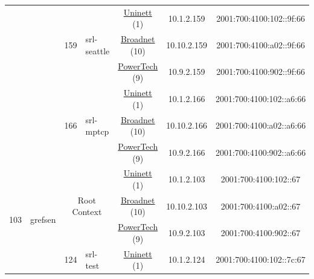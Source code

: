 \begin{small}
\begin{center}
\begin{longtable}{|c|c|c|c|c|c|c|c|}
  &  & \multirow{3}{*}{\tiny{159}} & \multicolumn{1}{|l|}{\multirow{3}{*}{\tiny{srl-seattle}}} & \multicolumn{2}{|c|}{\tiny{\href{https://www.uninett.no}{Uninett} (1)}} & \tiny{10.1.2.159} & \tiny{2001:700:4100:102::9f:66} \\* \cline{5-5}\cline{6-6}\cline{7-7}\cline{8-8}
  &  &  &  & \multicolumn{2}{|c|}{\tiny{\href{https://www.broadnet.no}{Broadnet} (10)}} & \tiny{10.10.2.159} & \tiny{2001:700:4100:a02::9f:66} \\* \cline{5-5}\cline{6-6}\cline{7-7}\cline{8-8}
  &  &  &  & \multicolumn{2}{|c|}{\tiny{\href{http://www.powertech.no}{PowerTech} (9)}} & \tiny{10.9.2.159} & \tiny{2001:700:4100:902::9f:66} \\* \cline{3-3}\cline{4-4}\cline{5-5}\cline{6-6}\cline{7-7}\cline{8-8}
  &  & \multirow{3}{*}{\tiny{166}} & \multicolumn{1}{|l|}{\multirow{3}{*}{\tiny{srl-mptcp}}} & \multicolumn{2}{|c|}{\tiny{\href{https://www.uninett.no}{Uninett} (1)}} & \tiny{10.1.2.166} & \tiny{2001:700:4100:102::a6:66} \\* \cline{5-5}\cline{6-6}\cline{7-7}\cline{8-8}
  &  &  &  & \multicolumn{2}{|c|}{\tiny{\href{https://www.broadnet.no}{Broadnet} (10)}} & \tiny{10.10.2.166} & \tiny{2001:700:4100:a02::a6:66} \\* \cline{5-5}\cline{6-6}\cline{7-7}\cline{8-8}
  &  &  &  & \multicolumn{2}{|c|}{\tiny{\href{http://www.powertech.no}{PowerTech} (9)}} & \tiny{10.9.2.166} & \tiny{2001:700:4100:902::a6:66} \\ \hline
 \multirow{30}{*}{\tiny{103}} & \multicolumn{1}{|l|}{\multirow{30}{*}{\tiny{grefsen}}} & \multicolumn{2}{|c|}{\multirow{3}{*}{\tiny{Root Context}}} & \multicolumn{2}{|c|}{\tiny{\href{https://www.uninett.no}{Uninett} (1)}} & \tiny{10.1.2.103} & \tiny{2001:700:4100:102::67} \\* \cline{5-5}\cline{6-6}\cline{7-7}\cline{8-8}
  &  & \multicolumn{2}{|c|}{} & \multicolumn{2}{|c|}{\tiny{\href{https://www.broadnet.no}{Broadnet} (10)}} & \tiny{10.10.2.103} & \tiny{2001:700:4100:a02::67} \\* \cline{5-5}\cline{6-6}\cline{7-7}\cline{8-8}
  &  & \multicolumn{2}{|c|}{} & \multicolumn{2}{|c|}{\tiny{\href{http://www.powertech.no}{PowerTech} (9)}} & \tiny{10.9.2.103} & \tiny{2001:700:4100:902::67} \\* \cline{3-3}\cline{4-4}\cline{5-5}\cline{6-6}\cline{7-7}\cline{8-8}
  &  & \multirow{3}{*}{\tiny{124}} & \multicolumn{1}{|l|}{\multirow{3}{*}{\tiny{srl-test}}} & \multicolumn{2}{|c|}{\tiny{\href{https://www.uninett.no}{Uninett} (1)}} & \tiny{10.1.2.124} & \tiny{2001:700:4100:102::7c:67} \\* \cline{5-5}\cline{6-6}\cline{7-7}\cline{8-8}

\end{longtable}
\end{center}
\end{small}
